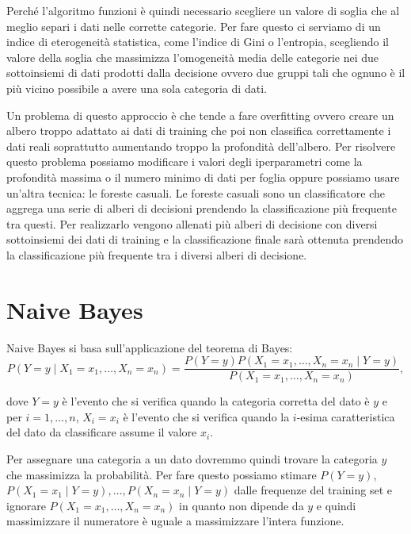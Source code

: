 \documentclass[a4paper,12pt]{report}
\begin{document}
Perché l'algoritmo funzioni è quindi necessario scegliere un valore di soglia
che al meglio separi i dati nelle corrette categorie. Per fare questo ci
serviamo di un indice di eterogeneità statistica, come l'indice di Gini o
l'entropia, scegliendo il valore della soglia che massimizza l'omogeneità
media delle categorie nei due sottoinsiemi di dati prodotti dalla decisione
ovvero due gruppi tali che ognuno è il più vicino possibile a avere una sola
categoria di dati.

Un problema di questo approccio è che tende a fare overfitting ovvero creare un
albero troppo adattato ai dati di training che poi non classifica correttamente
i dati reali soprattutto aumentando troppo la profondità dell'albero. Per
risolvere questo problema possiamo modificare i valori degli iperparametri come
la profondità massima o il numero minimo di dati per foglia oppure possiamo
usare un'altra tecnica: le foreste casuali. Le foreste casuali sono un
classificatore che aggrega una serie di alberi di decisioni prendendo la
classificazione più frequente tra questi. Per realizzarlo vengono allenati più
alberi di decisione con diversi sottoinsiemi dei dati di training e la
classificazione finale sarà ottenuta prendendo la classificazione più frequente
tra i diversi alberi di decisione.

\section{Naive Bayes}

Naive Bayes si basa sull'applicazione del teorema di Bayes:
$$
P(Y=y \mid X_1=x_1, \dots, X_n=x_n) = \frac{P(Y=y) P(X_1=x_1, \dots, X_n=x_n \mid Y=y)}
                                 				{P(X_1=x_1, \dots, X_n=x_n)},
$$

\noindent dove $Y = y$ è l'evento che si verifica quando la categoria corretta
del dato è $y$ e per $i = 1, ..., n$, $X_i = x_i$ è l'evento che si verifica
quando la $i$-esima caratteristica del dato da classificare assume il valore
$x_i$.


Per assegnare una categoria a un dato dovremmo quindi trovare la categoria $y$
che massimizza la probabilità. Per fare questo possiamo stimare $P(Y = y)$, $P(X_1 = x_1 \mid Y = y), \dots, P(X_n = x_n \mid Y
= y)$ dalle frequenze del training set e ignorare $P(X_1=x_1, \dots, X_n=x_n)$
in quanto non dipende da $y$ e quindi massimizzare il numeratore è uguale a
massimizzare l'intera funzione. 
\end{document}
